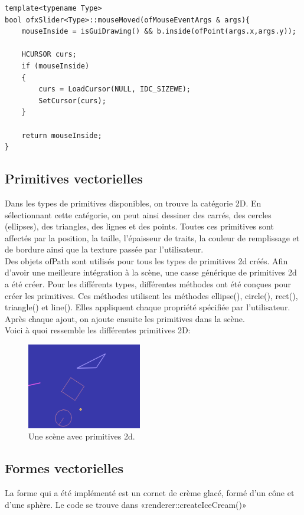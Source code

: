 \begin{lstlisting}
template<typename Type>
bool ofxSlider<Type>::mouseMoved(ofMouseEventArgs & args){
	mouseInside = isGuiDrawing() && b.inside(ofPoint(args.x,args.y));
	
	HCURSOR curs;
	if (mouseInside)
	{
		curs = LoadCursor(NULL, IDC_SIZEWE);
		SetCursor(curs);
	}
	
	return mouseInside;
}
\end{lstlisting}

\subsection{Primitives vectorielles}

Dans les types de primitives disponibles, on trouve la catégorie 2D. En sélectionnant cette catégorie, on peut ainsi dessiner des carrés, des cercles (ellipses), des triangles, des lignes et des points. Toutes ces primitives sont affectés par la position, la taille, l’épaisseur de traits, la couleur de remplissage et de bordure ainsi que la texture passée par l’utilisateur.\\

Des objets ofPath sont utilisés pour tous les types de primitives 2d créés. Afin d’avoir une meilleure intégration à la scène, une casse générique de primitives 2d a été créer. Pour les différents types, différentes méthodes ont été conçues pour créer les primitives. Ces méthodes utilisent les méthodes ellipse(), circle(), rect(), triangle() et line(). Elles appliquent chaque propriété spécifiée par l’utilisateur. Après chaque ajout, on ajoute ensuite les primitives dans la scène.\\

Voici à quoi ressemble les différentes primitives 2D:\\
\begin{figure}[h]
	\centering
	\includegraphics[width=5cm]{fig/primitives2d.png}
	\caption{Une scène avec primitives 2d.}
	\label{fig:prim2d}
\end{figure}

\subsection{Formes vectorielles}
La forme qui a été implémenté est un cornet de crème glacé, formé d'un cône et d'une sphère. Le code se trouve dans «renderer::createIceCream()» 

